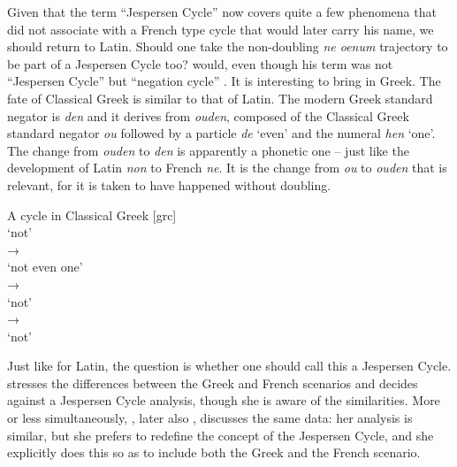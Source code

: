 ﻿\documentclass[output=paper,draft,draftmode,colorlinks,citecolor=brown]{langscibook}
\begin{document}
Given that the term ``Jespersen Cycle'' now covers quite a few phenomena
that \textcite{Jespersen1917} did not associate with a French type cycle
that would later carry his name, we should return to Latin. Should one
take the non-doubling \textit{ne oenum} trajectory to be part of
a Jespersen Cycle too? \textcites{Schwegler1983}{Schwegler1988} would, even though his term
was not ``Jespersen Cycle'' but ``negation cycle'' \parencite[cp. also]
[180]{Gianollo2018a}. It is interesting to bring in Greek. The
fate of Classical Greek is similar to that of Latin. The modern Greek
standard negator is \textit{den} and it derives from \textit{ouden},
composed of the Classical Greek standard negator \textit{ou} followed by
a particle \textit{de} `even' and the numeral \textit{hen} `one'. The
change from \textit{ouden} to \textit{den} is apparently a phonetic one
\parencite[303]{Willmott2013} -- just like the development of Latin
\textit{non} to French \textit{ne}. It is the change from \textit{ou} to
\textit{ouden} that is relevant, for it is taken to have happened without
doubling.
%
\begin{exe}\ex\label{ex:int-a-cycle-in-greek}
A cycle in Classical Greek [grc]\\[1ex]
     `not'\\
→\\
  `not even one'\\
→\\
  `not'\\
→\\
      `not'
    \end{exe}
%
Just like for Latin, the question is whether one should call this a
Jespersen Cycle. \textcite{Willmott2013} stresses the differences between the
Greek and French scenarios and decides against a Jespersen Cycle analysis,
though she is aware of the similarities. More or less simultaneously,
\textcite{Chatzopoulou2012}, later also
\textcites{Chatzopoulou2015}{Chatzopoulou2019}, discusses
the same data: her analysis is similar, but she prefers to redefine the
concept of the Jespersen Cycle, and she explicitly does this so as to
include both the Greek and the French scenario. 
\end{document}
